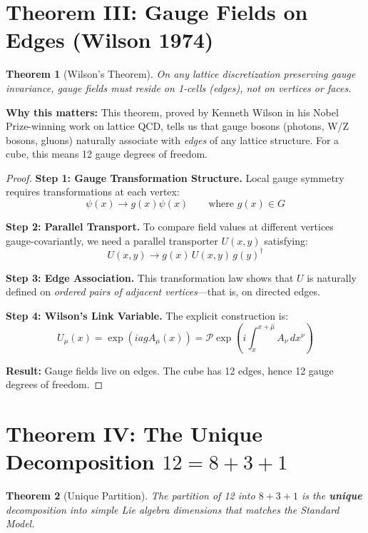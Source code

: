 \documentclass[11pt,a4paper]{article}
\theoremstyle{plain}
\newtheorem{theorem}{Theorem}[section]
\theoremstyle{definition}
\theoremstyle{remark}
\begin{document}
\section{Theorem III: Gauge Fields on Edges (Wilson 1974)}

\begin{theorem}[Wilson's Theorem]
On any lattice discretization preserving gauge invariance, gauge fields must reside on 1-cells (edges), not on vertices or faces.
\end{theorem}

\textbf{Why this matters:} This theorem, proved by Kenneth Wilson in his Nobel Prize-winning work on lattice QCD, tells us that gauge bosons (photons, W/Z bosons, gluons) naturally associate with \emph{edges} of any lattice structure. For a cube, this means 12 gauge degrees of freedom.

\begin{proof}
\textbf{Step 1: Gauge Transformation Structure.} Local gauge symmetry requires transformations at each vertex:
\[
\psi(x) \to g(x)\psi(x) \qquad \text{where } g(x) \in G
\]

\textbf{Step 2: Parallel Transport.} To compare field values at different vertices gauge-covariantly, we need a parallel transporter $U(x,y)$ satisfying:
\[
U(x,y) \to g(x) \, U(x,y) \, g(y)^\dagger
\]

\textbf{Step 3: Edge Association.} This transformation law shows that $U$ is naturally defined on \emph{ordered pairs of adjacent vertices}---that is, on directed edges.

\textbf{Step 4: Wilson's Link Variable.} The explicit construction is:
\[
U_\mu(x) = \exp\left(iagA_\mu(x)\right) = \mathcal{P}\exp\left(i\int_x^{x+\hat{\mu}} A_\nu \, dx^\nu\right)
\]

\textbf{Result:} Gauge fields live on edges. The cube has 12 edges, hence 12 gauge degrees of freedom.
\end{proof}

\section{Theorem IV: The Unique Decomposition $12 = 8 + 3 + 1$}

\begin{theorem}[Unique Partition]
The partition of 12 into $8 + 3 + 1$ is the \textbf{unique} decomposition into simple Lie algebra dimensions that matches the Standard Model.
\end{theorem}
\end{document}
